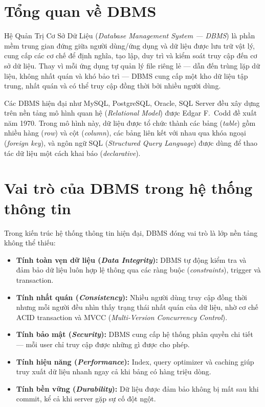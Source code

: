 \documentclass[13pt, a4paper]{report}
\begin{document}
\section{Tổng quan về DBMS}

Hệ Quản Trị Cơ Sở Dữ Liệu (\textit{Database Management System --- DBMS}) là phần mềm trung gian đứng giữa người dùng/ứng dụng và dữ liệu được lưu trữ vật lý, cung cấp các cơ chế để định nghĩa, tạo lập, duy trì và kiểm soát truy cập đến cơ sở dữ liệu. Thay vì mỗi ứng dụng tự quản lý file riêng lẻ --- dẫn đến trùng lặp dữ liệu, không nhất quán và khó bảo trì --- DBMS cung cấp một kho dữ liệu tập trung, nhất quán và có thể truy cập đồng thời bởi nhiều người dùng.

Các DBMS hiện đại như MySQL, PostgreSQL, Oracle, SQL Server đều xây dựng trên nền tảng mô hình quan hệ (\textit{Relational Model}) được Edgar F.\ Codd đề xuất năm 1970. Trong mô hình này, dữ liệu được tổ chức thành các bảng (\textit{table}) gồm nhiều hàng (\textit{row}) và cột (\textit{column}), các bảng liên kết với nhau qua khóa ngoại (\textit{foreign key}), và ngôn ngữ SQL (\textit{Structured Query Language}) được dùng để thao tác dữ liệu một cách khai báo (\textit{declarative}).

\section{Vai trò của DBMS trong hệ thống thông tin}

Trong kiến trúc hệ thống thông tin hiện đại, DBMS đóng vai trò là lớp nền tảng không thể thiếu:

\begin{itemize}[leftmargin=1.5cm]
  \item \textbf{Tính toàn vẹn dữ liệu (\textit{Data Integrity}):} DBMS tự động kiểm tra và đảm bảo dữ liệu luôn hợp lệ thông qua các ràng buộc (\textit{constraints}), trigger và transaction.
  \item \textbf{Tính nhất quán (\textit{Consistency}):} Nhiều người dùng truy cập đồng thời nhưng mỗi người đều nhìn thấy trạng thái nhất quán của dữ liệu, nhờ cơ chế ACID transaction và MVCC (\textit{Multi-Version Concurrency Control}).
  \item \textbf{Tính bảo mật (\textit{Security}):} DBMS cung cấp hệ thống phân quyền chi tiết --- mỗi user chỉ truy cập được những gì được cho phép.
  \item \textbf{Tính hiệu năng (\textit{Performance}):} Index, query optimizer và caching giúp truy xuất dữ liệu nhanh ngay cả khi bảng có hàng triệu dòng.
  \item \textbf{Tính bền vững (\textit{Durability}):} Dữ liệu được đảm bảo không bị mất sau khi commit, kể cả khi server gặp sự cố đột ngột.
\end{itemize}
\end{document}
